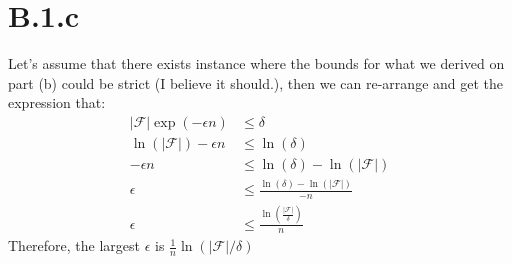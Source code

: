 \documentclass[]{article}
\begin{document}
    \section*{B.1.c}
        Let's assume that there exists instance where the bounds for what we derived on part (b) could be strict (I believe it should.), then we can re-arrange and get the expression that: 
        \begin{align*}\tag{B.1.c.1}\label{eqn:B.1.c.1}
            |\mathcal{F}|\exp(-\epsilon n) &\le \delta
            \\
            \ln(|\mathcal{F}|) - \epsilon n &\le \ln(\delta)
            \\
            -\epsilon n &\le \ln(\delta) - \ln(|\mathcal{F}|)
            \\
            \epsilon &\le \frac{\ln(\delta) - \ln(|\mathcal{F}|)}{-n}
            \\
            \epsilon &\le \frac{\ln(\frac{|\mathcal{F}|}{\delta})}
            {n}
        \end{align*}
        Therefore, the largest $\epsilon$ is $\frac{1}{n}\ln(|\mathcal{F}|/\delta)$
\end{document}
